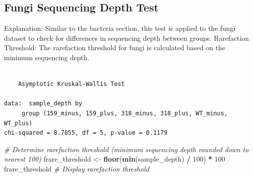 \documentclass[
  11pt,
]{article}
\newenvironment{Shaded}{\begin{snugshade}}{\end{snugshade}}
\newcommand{\AttributeTok}[1]{\textcolor[rgb]{0.13,0.29,0.53}{#1}}
\newcommand{\CommentTok}[1]{\textcolor[rgb]{0.56,0.35,0.01}{\textit{#1}}}
\newcommand{\DecValTok}[1]{\textcolor[rgb]{0.00,0.00,0.81}{#1}}
\newcommand{\FunctionTok}[1]{\textcolor[rgb]{0.13,0.29,0.53}{\textbf{#1}}}
\newcommand{\NormalTok}[1]{#1}
\newcommand{\OtherTok}[1]{\textcolor[rgb]{0.56,0.35,0.01}{#1}}
\newcommand{\SpecialCharTok}[1]{\textcolor[rgb]{0.81,0.36,0.00}{\textbf{#1}}}
\newcommand{\StringTok}[1]{\textcolor[rgb]{0.31,0.60,0.02}{#1}}
\begin{document}
\subsection{Fungi Sequencing Depth
Test}\label{fungi-sequencing-depth-test}

Explanation: Similar to the bacteria section, this test is applied to
the fungi dataset to check for differences in sequencing depth between
groups. Rarefaction Threshold: The rarefaction threshold for fungi is
calculated based on the minimum sequencing depth.

\begin{Shaded}
\end{Shaded}

\begin{verbatim}

    Asymptotic Kruskal-Wallis Test

data:  sample_depth by
     group (159_minus, 159_plus, 318_minus, 318_plus, WT_minus, WT_plus)
chi-squared = 8.7855, df = 5, p-value = 0.1179
\end{verbatim}

\begin{Shaded}
\begin{Highlighting}[]
\CommentTok{\# Determine rarefaction threshold (minimum sequencing depth rounded down to nearest 100)}
\NormalTok{frare\_threshold }\OtherTok{\textless{}{-}} \FunctionTok{floor}\NormalTok{(}\FunctionTok{min}\NormalTok{(sample\_depth) }\SpecialCharTok{/} \DecValTok{100}\NormalTok{) }\SpecialCharTok{*} \DecValTok{100}
\NormalTok{frare\_threshold  }\CommentTok{\# Display rarefaction threshold}
\end{Highlighting}
\end{Shaded}
\end{document}
